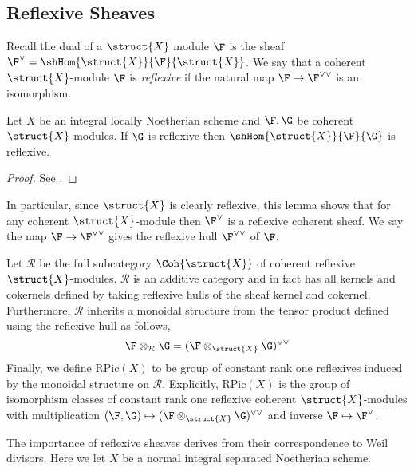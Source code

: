 \subsection{Reflexive Sheaves}

\newcommand{\RPic}[1]{\mathrm{RPic}\left( #1 \right)}
\renewcommand{\R}{\mathcal{R}}

\begin{defn}
Recall the dual of a $\struct{X}$ module $\F$ is the sheaf $\F^\vee = \shHom{\struct{X}}{\F}{\struct{X}}$. We say that a coherent $\struct{X}$-module $\F$ is \textit{reflexive} if the natural map $\F \to \F^{\vee \vee}$ is an isomorphism. 
\end{defn}

\begin{lemma}
Let $X$ be an integral locally Noetherian scheme and $\F, \G$ be coherent $\struct{X}$-modules. If $\G$ is reflexive then $\shHom{\struct{X}}{\F}{\G}$ is reflexive.
\end{lemma}

\begin{proof}
See \cite[\href{https://stacks.math.columbia.edu/tag/0AY4}{Tag 0AY4}]{stacks-project}.
\end{proof}
\noindent
In particular, since $\struct{X}$ is clearly reflexive, this lemma shows that for any coherent $\struct{X}$-module then $\F^\vee$ is a reflexive coherent sheaf. We say the map $\F \to \F^{\vee \vee}$ gives the reflexive hull $\F^{\vee \vee}$ of $\F$.

\begin{defn}
Let $\R$ be the full subcategory $\Coh{\struct{X}}$ of coherent reflexive $\struct{X}$-modules. $\R$ is an additive category   and in fact has all kernels and cokernels defined by taking reflexive hulls of the sheaf kernel and cokernel. Furthermore, $\R$ inherits a monoidal structure from the tensor product defined using the reflexive hull as follows,
\[ \F \otimes_\R \G = (\F \otimes_{\struct{X}} \G)^{\vee \vee} \]
Finally, we define $\RPic{X}$ to be group of constant rank one reflexives induced by the monoidal structure on $\R$. Explicitly, $\RPic{X}$ is the group of isomorphism classes of constant rank one reflexive coherent $\struct{X}$-modules with multiplication $(\F, \G) \mapsto (\F \otimes_{\struct{X}} \G)^{\vee \vee}$ and inverse $\F \mapsto \F^\vee$. 
\end{defn}
\noindent
The importance of reflexive sheaves derives from their correspondence to Weil divisors. Here we let $X$ be a normal integral separated Noetherian scheme. 

